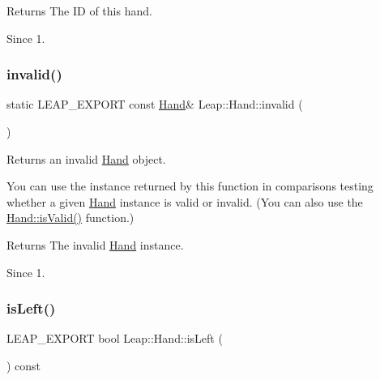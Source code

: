 \begin{DoxyCodeInclude}
\end{DoxyCodeInclude}


\begin{DoxyReturn}{Returns}
The ID of this hand. 
\end{DoxyReturn}
\begin{DoxySince}{Since}
1. 
\end{DoxySince}
\mbox{\label{class_leap_1_1_hand_ae66c7683d1c179cb3fa1913be320ea6a}} 
\subsubsection{\texorpdfstring{invalid()}{invalid()}}
{\footnotesize\ttfamily static L\+E\+A\+P\+\_\+\+E\+X\+P\+O\+RT const \hyperlink{class_leap_1_1_hand}{Hand}\& Leap\+::\+Hand\+::invalid (\begin{DoxyParamCaption}{ }\end{DoxyParamCaption})\hspace{0.3cm}{\ttfamily [static]}}

Returns an invalid \hyperlink{class_leap_1_1_hand}{Hand} object.


\begin{DoxyCodeInclude}
\end{DoxyCodeInclude}


You can use the instance returned by this function in comparisons testing whether a given \hyperlink{class_leap_1_1_hand}{Hand} instance is valid or invalid. (You can also use the \hyperlink{class_leap_1_1_hand_a596f55bc25a088c0a1760bbbca5ec2a8}{Hand\+::is\+Valid()} function.)

\begin{DoxyReturn}{Returns}
The invalid \hyperlink{class_leap_1_1_hand}{Hand} instance. 
\end{DoxyReturn}
\begin{DoxySince}{Since}
1. 
\end{DoxySince}
\mbox{\label{class_leap_1_1_hand_a97a82aa4c1ca8ef138fc8d9939b017d8}} 
\subsubsection{\texorpdfstring{is\+Left()}{isLeft()}}
{\footnotesize\ttfamily L\+E\+A\+P\+\_\+\+E\+X\+P\+O\+RT bool Leap\+::\+Hand\+::is\+Left (\begin{DoxyParamCaption}{ }\end{DoxyParamCaption}) const}

